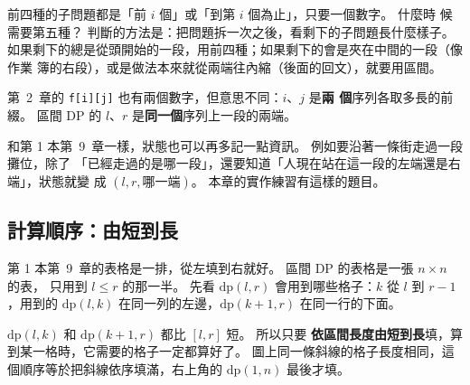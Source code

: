 前四種的子問題都是「前 $i$ 個」或「到第 $i$ 個為止」，只要一個數字。 什麼時
候需要第五種？ 判斷的方法是：把問題拆一次之後，看剩下的子問題長什麼樣子。
如果剩下的總是從頭開始的一段，用前四種；如果剩下的會是夾在中間的一段（像作業
簿的右段），或是做法本來就從兩端往內縮（後面的回文），就要用區間。

第~2~章的 \texttt{f[i][j]} 也有兩個數字，但意思不同：$i$、$j$ 是\textbf{兩
個}序列各取多長的前綴。 區間 DP 的 $l$、$r$ 是\textbf{同一個}序列上一段的兩端。

和第 1 本第~9~章一樣，狀態也可以再多記一點資訊。 例如要沿著一條街走過一段攤位，除了
「已經走過的是哪一段」，還要知道「人現在站在這一段的左端還是右端」，狀態就變
成 $(l, r, \text{哪一端})$。 本章的實作練習有這樣的題目。

\subsection{計算順序：由短到長}
\label{sec:ivdp-order}

第 1 本第~9~章的表格是一排，從左填到右就好。 區間 DP 的表格是一張 $n \times n$ 的表，
只用到 $l \le r$ 的那一半。 先看 $\mathrm{dp}(l, r)$ 會用到哪些格子：$k$ 從
$l$ 到 $r - 1$，用到的 $\mathrm{dp}(l, k)$ 在同一列的左邊，$\mathrm{dp}(k + 1, r)$
在同一行的下面。

\begin{center}
\label{fig:ivdp-table}
\end{center}

$\mathrm{dp}(l, k)$ 和 $\mathrm{dp}(k + 1, r)$ 都比 $[l, r]$ 短。 所以只要
\textbf{依區間長度由短到長}填，算到某一格時，它需要的格子一定都算好了。
圖上同一條斜線的格子長度相同，這個順序等於把斜線依序填滿，右上角的
$\mathrm{dp}(1, n)$ 最後才填。

